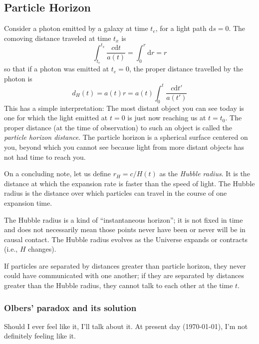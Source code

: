 \subsection{Particle Horizon}

Consider a photon emitted by a galaxy at time $t_{e}$, for a light path $\text{d}s = 0$. The comoving distance traveled at time $t_{x}$ is
\begin{equation*}
    \int_{t_{e}}^{t_{x}} \frac{c\text{d}t}{a(t)} = \int_{0}^{r}\text{d}r = r
\end{equation*}
so that if a photon was emitted at $t_{e} = 0$, the proper distance travelled by the photon is 
\begin{equation}
    d_{H}(t) = a(t)r = a(t)\int_{0}^{t}\frac{c\text{d}t'}{a(t')}
    \label{eq:particle_horizon}
\end{equation}
This has a simple interpretation: The most distant object you can see today is one for which the light emitted at $t = 0$ is just now reaching us at $t = t_{0}$. The proper distance (at the time of observation) to such an object is called the \emph{particle horizon distance}. The particle horizon is a spherical surface centered on you, beyond which you cannot see because light from more distant objects has not had time to reach you.
\par On a concluding note, let us define $r_{H} = c/H(t)$ as the \emph{Hubble radius}. It is the distance at which the expansion rate is faster than the speed of light. The Hubble radius is the distance over which particles can travel in the course of one expansion time.
\par The Hubble radius is a kind of “instantaneous horizon”; it is not fixed in time and does not necessarily mean those points never have been or never will be in causal contact. The Hubble radius evolves as the Universe expands or contracts (i.e., $H$ changes).
\par If particles are separated by distances greater than particle horizon, they never could have communicated with one another; if they are separated by distances greater than the Hubble radius, they cannot talk to each other at the time $t$.

\subsubsection{Olbers' paradox and its solution}

Should I ever feel like it, I'll talk about it. At present day (\today), I'm not definitely feeling like it.

